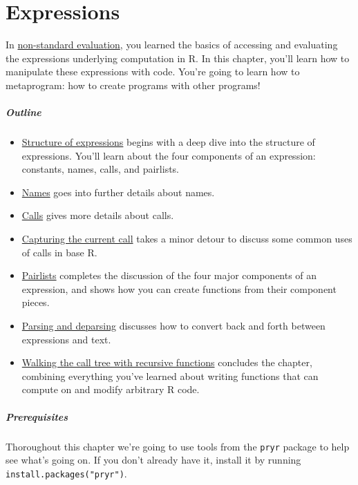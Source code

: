 \chapter{Expressions}\label{metaprogramming}

In \hyperref[nse]{non-standard evaluation}, you learned the basics of
accessing and evaluating the expressions underlying computation in R. In
this chapter, you'll learn how to manipulate these expressions with
code. You're going to learn how to metaprogram: how to create programs
with other programs! 

\paragraph{Outline}

\begin{itemize}
\item
  \hyperref[structure-of-expressions]{Structure of expressions} begins
  with a deep dive into the structure of expressions. You'll learn about
  the four components of an expression: constants, names, calls, and
  pairlists.
\item
  \hyperref[names]{Names} goes into further details about names.
\item
  \hyperref[calls]{Calls} gives more details about calls.
\item
  \hyperref[capturing-call]{Capturing the current call} takes a minor
  detour to discuss some common uses of calls in base R.
\item
  \hyperref[pairlists]{Pairlists} completes the discussion of the four
  major components of an expression, and shows how you can create
  functions from their component pieces.
\item
  \hyperref[parsing-and-deparsing]{Parsing and deparsing} discusses how
  to convert back and forth between expressions and text.
\item
  \hyperref[ast-funs]{Walking the call tree with recursive functions}
  concludes the chapter, combining everything you've learned about
  writing functions that can compute on and modify arbitrary R code.
\end{itemize}

\paragraph{Prerequisites}

Thoroughout this chapter we're going to use tools from the \texttt{pryr}
package to help see what's going on. If you don't already have it,
install it by running \texttt{install.packages("pryr")}.

